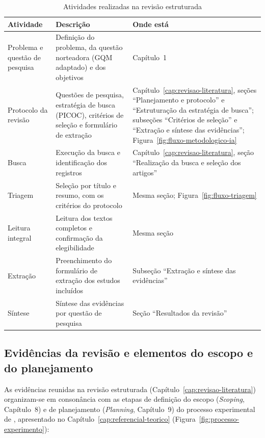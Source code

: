 \begin{table}[htb]
\centering
\caption{Atividades realizadas na revisão estruturada}
\label{tab:etapas-metodologia}
\footnotesize
\begin{tabular}{>{\raggedright\arraybackslash}p{3.0cm} >{\raggedright\arraybackslash}p{5.6cm} >{\raggedright\arraybackslash}p{6.0cm}}
\toprule
\textbf{Atividade} & \textbf{Descrição} & \textbf{Onde está} \\
\midrule
Problema e questão de pesquisa & Definição do problema, da questão norteadora (GQM adaptado) e dos objetivos & Capítulo~1 \\
Protocolo da revisão & Questões de pesquisa, estratégia de busca (PICOC), critérios de seleção e formulário de extração & Capítulo~\ref{cap:revisao-literatura}, seções ``Planejamento e protocolo'' e ``Estruturação da estratégia de busca''; subseções ``Critérios de seleção'' e ``Extração e síntese das evidências''; Figura~\ref{fig:fluxo-metodologico-ia} \\
Busca & Execução da busca e identificação dos registros & Capítulo~\ref{cap:revisao-literatura}, seção ``Realização da busca e seleção dos artigos'' \\
Triagem & Seleção por título e resumo, com os critérios do protocolo & Mesma seção; Figura~\ref{fig:fluxo-triagem} \\
Leitura integral & Leitura dos textos completos e confirmação da elegibilidade & Mesma seção \\
Extração & Preenchimento do formulário de extração dos estudos incluídos & Subseção ``Extração e síntese das evidências'' \\
Síntese & Síntese das evidências por questão de pesquisa & Seção ``Resultados da revisão'' \\
\bottomrule
\end{tabular}
\end{table}

\subsection{Evidências da revisão e elementos do escopo e do planejamento}

As evidências reunidas na revisão estruturada (Capítulo~\ref{cap:revisao-literatura})
organizam-se em consonância com as etapas de definição do escopo (\textit{Scoping}, Capítulo~8)
e de planejamento (\textit{Planning}, Capítulo~9) do processo experimental de ,
apresentado no Capítulo~\ref{cap:referencial-teorico} (Figura~\ref{fig:processo-experimento}):

